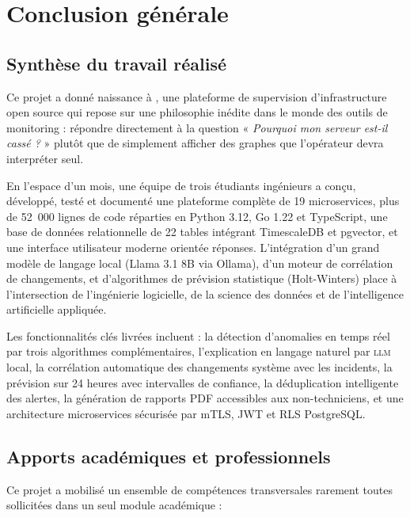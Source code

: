 \chapter{Conclusion générale}

\section{Synthèse du travail réalisé}

Ce projet a donné naissance à \textbf{\caimp{}}, une plateforme de supervision
d'infrastructure open source qui repose sur une philosophie inédite dans le
monde des outils de monitoring : répondre directement à la question
« \textit{Pourquoi mon serveur est-il cassé ?} » plutôt que de simplement
afficher des graphes que l'opérateur devra interpréter seul.

En l'espace d'un mois, une équipe de trois étudiants ingénieurs a conçu,
développé, testé et documenté une plateforme complète de 19 microservices,
plus de 52~000 lignes de code réparties en Python 3.12, Go 1.22 et TypeScript,
une base de données relationnelle de 22 tables intégrant TimescaleDB et pgvector,
et une interface utilisateur moderne orientée réponses. L'intégration d'un grand
modèle de langage local (Llama 3.1 8B via Ollama), d'un moteur de corrélation
de changements, et d'algorithmes de prévision statistique (Holt-Winters) place
\caimp{} à l'intersection de l'ingénierie logicielle, de la science des données
et de l'intelligence artificielle appliquée.

Les fonctionnalités clés livrées incluent : la détection d'anomalies en temps
réel par trois algorithmes complémentaires, l'explication en langage naturel
par \textsc{llm} local, la corrélation automatique des changements système avec
les incidents, la prévision sur 24 heures avec intervalles de confiance, la
déduplication intelligente des alertes, la génération de rapports PDF accessibles
aux non-techniciens, et une architecture microservices sécurisée par mTLS, JWT
et RLS PostgreSQL.

\section{Apports académiques et professionnels}

Ce projet a mobilisé un ensemble de compétences transversales rarement toutes
sollicitées dans un seul module académique :

